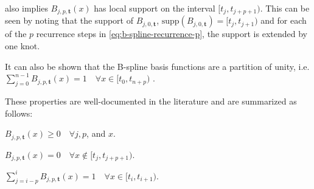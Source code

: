  also implies $B_{j, p, \mathbf{t}}(x)$ has local support on the interval $[t_j, t_{j+p+1})$. This can be seen by noting that the support of $B_{j, 0, \mathbf{t}}$, $\text{supp}(B_{j, 0, \mathbf{t}}) = [t_j, t_{j+1})$ and for each of the $p$ recurrence steps in \cref{eq:b-spline-recurrence-p}, the support is extended by one knot. 

It can also be shown that the B-spline basis functions are a partition of unity, i.e. $\sum_{j=0}^{n-1} B_{j, p, \mathbf{t}}(x) = 1 \quad\forall x \in [t_0, t_{n+p})$ \citep{deBoor1978practicalguide}.

These properties are well-documented in the literature and are summarized as follows:
\begin{property}[Nonnegativity]\label{b-prop:nonnegativity}
    $B_{j, p, \mathbf{t}}(x) \geq 0 \quad\forall j, p$, and $x$.
\end{property}

\begin{property}\label{b-prop:localsupport}
    $B_{j, p, \mathbf{t}}(x)=0 \quad\forall x \notin [t_j, t_{j+p+1})$.
\end{property}

\begin{property}\label{b-prop:partitionofunity}
    $\sum_{j=i-p}^i B_{j, p, \mathbf{t}}(x)=1 \quad\forall x \in [t_i, t_{i+1})$.
\end{property}

